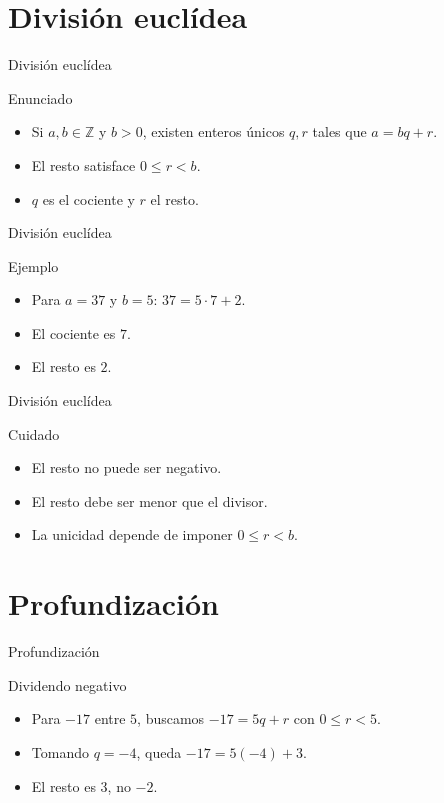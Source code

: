\documentclass[aspectratio=169,11pt]{beamer}
\begin{document}
\section{División euclídea}

\begin{frame}{División euclídea}
\begin{block}{Enunciado}
\begin{itemize}
  \item Si \(a,b\in\mathbb{Z}\) y \(b>0\), existen enteros únicos \(q,r\) tales que \(a=bq+r\).
  \item El resto satisface \(0\leq r<b\).
  \item \(q\) es el cociente y \(r\) el resto.
\end{itemize}
\end{block}
\end{frame}

\begin{frame}{División euclídea}
\begin{block}{Ejemplo}
\begin{itemize}
  \item Para \(a=37\) y \(b=5\): \(37=5\cdot 7+2\).
  \item El cociente es \(7\).
  \item El resto es \(2\).
\end{itemize}
\end{block}
\end{frame}

\begin{frame}{División euclídea}
\begin{block}{Cuidado}
\begin{itemize}
  \item El resto no puede ser negativo.
  \item El resto debe ser menor que el divisor.
  \item La unicidad depende de imponer \(0\leq r<b\).
\end{itemize}
\end{block}
\end{frame}

\section{Profundización}

\begin{frame}{Profundización}
\begin{block}{Dividendo negativo}
\begin{itemize}
  \item Para \(-17\) entre \(5\), buscamos \(-17=5q+r\) con \(0\leq r<5\).
  \item Tomando \(q=-4\), queda \(-17=5(-4)+3\).
  \item El resto es \(3\), no \(-2\).
\end{itemize}
\end{block}
\end{frame}
\end{document}
